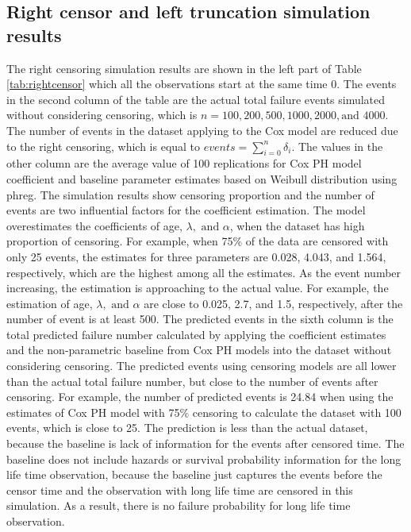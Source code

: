 \documentclass[12pt,letterpaper]{article}
\begin{document}
\subsection{Right censor and left truncation simulation results}
The right censoring simulation results are shown in the left part of Table \ref{tab:rightcensor} which all the observations start at the same time 0. The events in the second column of the table are the actual total failure events simulated without considering censoring, which is $n=100, 200, 500, 1000, 2000, \text{and } 4000$. The number of events in the dataset applying to the Cox model are reduced due to the right censoring, which is equal to $events=\sum_{i=0}^{n}{\delta_i}$. The values in the other column are the average value of 100 replications for Cox PH model coefficient and baseline parameter estimates based on Weibull distribution using phreg. The simulation results show censoring proportion and the number of events are two influential factors for the coefficient estimation. The model overestimates the coefficients of age, $\lambda, \text{ and } \alpha$, when the dataset has high proportion of censoring. For example, when 75\% of the data are censored with only 25 events, the estimates for three parameters are 0.028, 4.043, and 1.564, respectively, which are the highest among all the estimates. As the event number increasing, the estimation is approaching to the actual value. For example, the estimation of age, $\lambda, \text{ and } \alpha$ are close to 0.025, 2.7, and 1.5, respectively, after the number of event is at least 500.
The predicted events in the sixth column is the total predicted failure number calculated by applying the coefficient estimates and the non-parametric baseline from Cox PH models into the dataset without considering censoring. The predicted events using censoring models are all lower than the actual total failure number, but close to the number of events after censoring. For example, the number of predicted events is 24.84 when using the estimates of Cox PH model with 75\% censoring to calculate the dataset with 100 events, which is close to 25. The prediction is less than the actual dataset, because the baseline is lack of information for the events after censored time. The baseline does not include hazards or survival probability information for the long life time observation, because the baseline just captures the events before the censor time and the observation with long life time are censored in this simulation. As a result, there is no failure probability for long life time observation.
\end{document}
